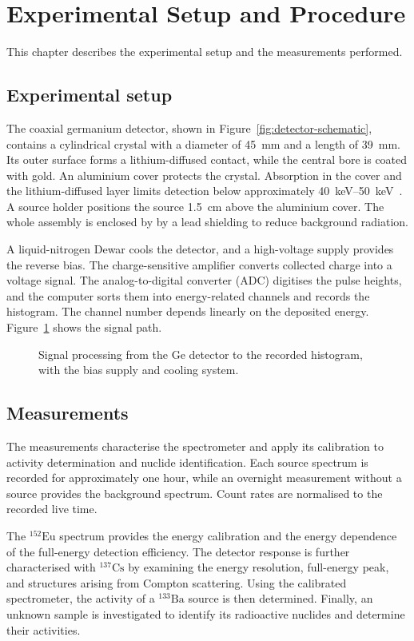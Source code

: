 \section{Experimental Setup and Procedure}
\label{sec:procedure}

This chapter describes the experimental setup and the measurements performed.

\subsection{Experimental setup}
\label{sec:setup}

The coaxial germanium detector, shown in Figure~\ref{fig:detector-schematic}, contains a cylindrical crystal with a diameter
of \SI{45}{\milli\metre} and a length of \SI{39}{\milli\metre}.
Its outer surface forms a lithium-diffused contact, while the central bore
is coated with gold. An aluminium
cover protects the crystal. Absorption in the cover and the lithium-diffused
layer limits detection below approximately
\SIrange{40}{50}{\kilo\electronvolt}~\cite{v18-manual}.
A source holder positions the source \SI{1.5}{\centi\metre} above the
aluminium cover. The whole assembly is enclosed by by a lead shielding to reduce background radiation.

A liquid-nitrogen Dewar cools the detector, and a high-voltage supply provides
the reverse bias. The charge-sensitive amplifier converts collected charge
into a voltage signal. The analog-to-digital converter (ADC) digitises the
pulse heights, and the computer sorts them into energy-related channels
and records the histogram. The channel number depends linearly on the
deposited energy. Figure~\ref{fig:signal-chain} shows the signal
path.

\begin{figure}[!htb]
  \centering
  
  \caption{Signal processing from the Ge detector to the recorded histogram,
  with the bias supply and cooling system.}
  \label{fig:signal-chain}
\end{figure}
\FloatBarrier

\subsection{Measurements}

The measurements characterise the spectrometer and apply its calibration to
activity determination and nuclide identification. Each source spectrum is
recorded for approximately one hour, while an overnight measurement without
a source provides the background spectrum. Count rates are normalised to the
recorded live time.

The $^{152}\mathrm{Eu}$ spectrum provides the energy calibration and the
energy dependence of the full-energy detection efficiency. The detector
response is further characterised with $^{137}\mathrm{Cs}$ by examining the
energy resolution, full-energy peak, and structures arising from Compton
scattering. Using the calibrated spectrometer, the activity of a
$^{133}\mathrm{Ba}$ source is then determined. Finally, an unknown sample is
investigated to identify its radioactive nuclides and determine their
activities.

